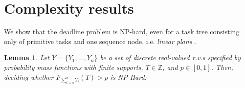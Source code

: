 \documentclass{article}
\newtheorem{lemma}{Lemma}
\begin{document}
%
%
%
%



\section{Complexity results}\label{sec:complexity}

We show that the deadline problem is NP-hard, 
even for a task tree consisting only of primitive tasks and one sequence node, i.e.
{\em linear plans} \cite{Russell:2003:AIM:773294,simmons2001planning, aktolga2004java}.

\begin{lemma} \label{SumDiscreteRV}
Let $Y=\{Y_1,\dots,Y_n\}$ be a set of discrete real-valued r.v.s specified by probability mass functions 
with finite supports, $T \in \mathbb{Z}$, and $p\in[0,1]$. Then, deciding  whether $F_{\sum_{i=0}^{n} Y_{i}}(T)>p $ is NP-Hard.
\end{lemma}
\end{document}
